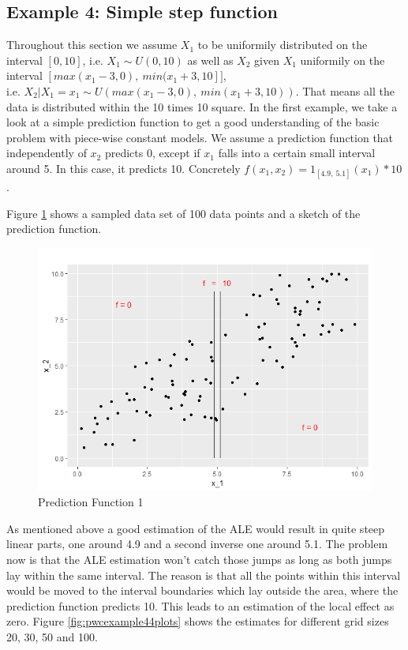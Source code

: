 \documentclass[]{krantz}
\begin{document}
\subsection{Example 4: Simple step
function}\label{example-4-simple-step-function}

Throughout this section we assume \(X_1\) to be uniformily distributed
on the interval \([0,10]\), i.e. \(X_1 \sim U(0,10)\) as well as \(X_2\)
given \(X_1\) uniformily on the interval
\([max(x_1 - 3, 0),~min( x_1 + 3, 10]]\),\\
i.e.
\(X_2 \vert X_1 = x_1 \sim U(max(x_1 - 3, 0),~min( x_1 + 3, 10) )\).
That means all the data is distributed within the 10 times 10 square. In
the first example, we take a look at a simple prediction function to get
a good understanding of the basic problem with piece-wise constant
models. We assume a prediction function that independently of \(x_2\)
predicts 0, except if \(x_1\) falls into a certain small interval around
5. In this case, it predicts 10. Concretely
\(f(x_1, x_2) = 1_{[4.9,~5.1]}(x_1) * 10\).

Figure \ref{fig:pwcexample4datasetpredf} shows a sampled data set of 100
data points and a sketch of the prediction function.

\begin{figure}
\includegraphics[width=1\linewidth]{images/ALE_2_pwc_example4_dataset_predf_} \caption{Prediction Function 1}\label{fig:pwcexample4datasetpredf}
\end{figure}



As mentioned above a good estimation of the ALE would result in quite
steep linear parts, one around 4.9 and a second inverse one around 5.1.
The problem now is that the ALE estimation won't catch those jumps as
long as both jumps lay within the same interval. The reason is that all
the points within this interval would be moved to the interval
boundaries which lay outside the area, where the prediction function
predicts 10. This leads to an estimation of the local effect as zero.
Figure \ref{fig:pwcexample44plots} shows the estimates for different
grid sizes 20, 30, 50 and 100.
\end{document}
